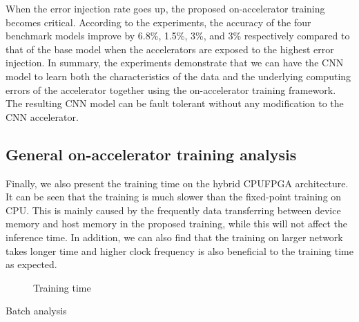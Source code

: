 When the error injection rate goes up, the proposed on-accelerator training becomes critical. 
According to the experiments, the accuracy of the four benchmark models improve by 6.8\%, 1.5\%, 3\%, and 3\% 
respectively compared to that of the base model when the accelerators are exposed to the highest 
error injection. In summary, the experiments demonstrate that we can have the CNN model to learn 
both the characteristics of the data and the underlying computing errors of the accelerator 
together using the on-accelerator training framework. The resulting CNN model can be fault tolerant 
without any modification to the CNN accelerator.  

\subsection{General on-accelerator training analysis}
  Finally, we also present the training time on the hybrid CPUFPGA architecture. 
It can be seen that the training is much slower than the fixed-point training on CPU. 
This is mainly caused by the frequently data transferring between device memory and host 
memory in the proposed training, while this will not affect the inference time. In addition, 
we can also find that the training on larger network takes longer time and higher clock frequency 
is also beneficial to the training time as expected. 

\begin{figure}
        \caption{Training time}
        \label{fig:time}
\end{figure}

Batch analysis
